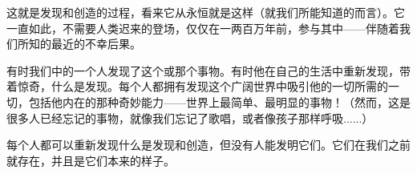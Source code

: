 这就是发现和创造的过程，看来它从永恒就是这样（就我们所能知道的而言）。它一直如此，不需要人类迟来的登场，仅仅在一两百万年前，参与其中——伴随着我们所知的最近的不幸后果。

有时我们中的一个人发现了这个或那个事物。有时他在自己的生活中重新发现，带着惊奇，什么是发现。每个人都拥有发现这个广阔世界中吸引他的一切所需的一切，包括他内在的那种奇妙能力——世界上最简单、最明显的事物！（然而，这是很多人已经忘记的事物，就像我们忘记了歌唱，或者像孩子那样呼吸......）

每个人都可以重新发现什么是发现和创造，但没有人能发明它们。它们在我们之前就存在，并且是它们本来的样子。
